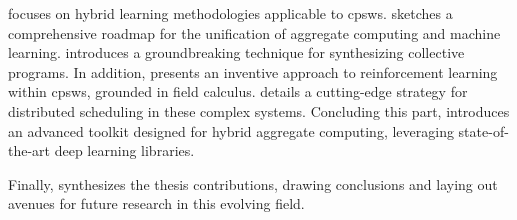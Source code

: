 \begin{refsection}
 focuses on hybrid learning methodologies applicable to \acp{cpsw}.  
  sketches a comprehensive roadmap for the unification of aggregate computing and machine learning. 
  introduces a groundbreaking technique for synthesizing collective programs. 
 In addition,  presents an inventive approach to reinforcement learning within \acp{cpsw}, grounded in field calculus. 
  details a cutting-edge strategy for distributed scheduling in these complex systems. 
 Concluding this part,  introduces an advanced toolkit designed for hybrid aggregate computing, 
 leveraging state-of-the-art deep learning libraries.

Finally,  synthesizes the thesis contributions, drawing conclusions and laying out avenues for future research in this evolving field.

\printbibliography[title=Reference,heading=bibintoc]
\end{refsection}
